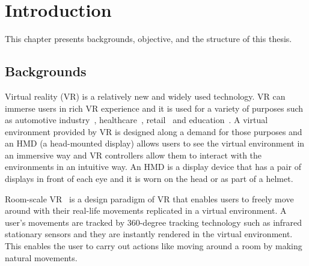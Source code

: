 
\chapter{Introduction} %

\label{Chapter1} %


\newcommand{\keyword}[1]{\textbf{#1}}
\newcommand{\tabhead}[1]{\textbf{#1}}
\newcommand{\code}[1]{\texttt{#1}}
\newcommand{\file}[1]{\texttt{\bfseries#1}}
\newcommand{\option}[1]{\texttt{\itshape#1}}

This chapter presents backgrounds, objective, and the structure of this thesis.

\section{Backgrounds}
Virtual reality (VR) is a relatively new and widely used technology. VR can immerse users in rich VR experience and it is used for a variety of purposes such as automotive industry~\cite{4290174}, healthcare~\cite{8446075}, retail~\cite{9522516} and education~\cite{8446486}. A virtual environment provided by VR is designed along a demand for those purposes and an HMD (a head-mounted display) allows users to see the virtual environment in an immersive way and VR controllers allow them to interact with the environments in an intuitive way. An HMD is a display device that has a pair of displays in front of each eye and it is worn on the head or as part of a helmet. 

Room-scale VR~\cite{7892373} is a design paradigm of VR that enables users to freely move around with their real-life movements replicated in a virtual environment. A user's movements are tracked by 360-degree tracking technology such as infrared stationary sensors and they are instantly rendered in the virtual environment. This enables the user to carry out actions like moving around a room by making natural movements.



